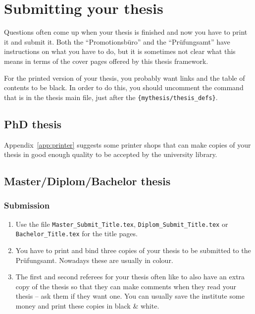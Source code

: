 \chapter{Submitting your thesis}
\label{sec:submit}

Questions often come up when your thesis is finished and now you have
to print it and submit it. Both the
\foreignquote{ngerman}{Promotionsbüro} and the
\foreignquote{ngerman}{Prüfungsamt} have instructions on what you have
to do, but it is sometimes not clear what this means in terms of the
cover pages offered by this thesis framework.

For the printed version of your thesis, you probably want
 links and the table of contents to be black. In
order to do this, you should uncomment the  command
that is in the thesis main file, just after the
\texttt{\{mythesis/thesis\_defs\}}.


\section{PhD thesis}
\label{sec:submit:phd}



Appendix~\ref{app:printer} suggests some printer shops that can make copies
of your thesis in good enough quality to be accepted by the university
library.


\section{Master/Diplom/Bachelor thesis}
\label{sec:submit:other}

\subsection{Submission}

\begin{enumerate}
\item Use the file \texttt{Master\_Submit\_Title.tex},
  \texttt{Diplom\_Submit\_Title.tex} or
  \texttt{Bachelor\_Title.tex} for the title pages.
\item You have to print and bind three copies of your thesis
  to be submitted to the
  \foreignlanguage{ngerman}{Prüfungsamt}. Nowadays these are usually in
  colour.
\item The first and second referees for your thesis often like to also
  have an extra copy of the thesis so that they can make comments when they read
  your thesis -- ask them if they want one. You can usually save the
  institute some money and print these copies in black \& white.
\end{enumerate}

